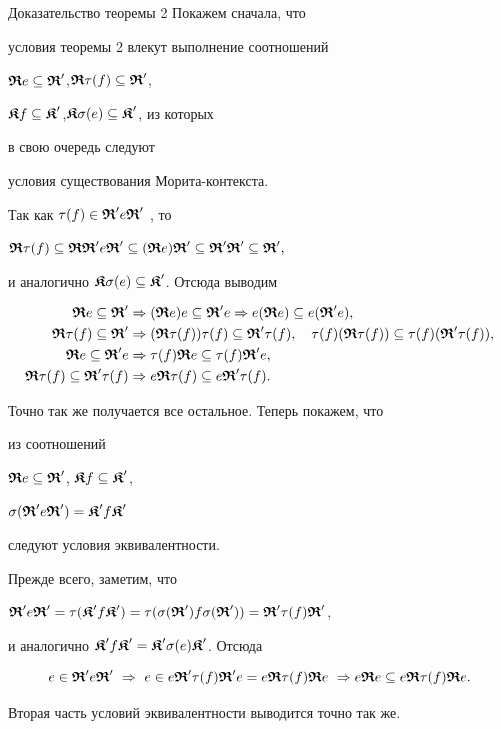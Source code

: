 \begin{pf*}{Доказательство теоремы 2} Покажем сначала, что


условия теоремы 2 влекут выполнение соотношений


$ \boldsymbol{\frak R} e \subseteq \boldsymbol{\frak R}'$,$\boldsymbol{\frak R} \tau(f) \subseteq \boldsymbol{\frak R}'$,


$ \boldsymbol{\frak K} f \subseteq \boldsymbol{\frak K}'$,$\boldsymbol{\frak K} \sigma(e) \subseteq \boldsymbol{\frak K}'$, из которых


в свою очередь следуют


условия существования Морита-контекста.


Так как $\tau(f) \in \boldsymbol{\frak R}'e \boldsymbol{\frak R}'$ , то


$\R\t(f) \subseteq \R\R' e \R' \subseteq (\R e)\R'


\subseteq \R'\R' \subseteq \R',$


и аналогично $ \boldsymbol{\frak K}\sigma(e) \subseteq \boldsymbol{\frak K}'$. Отсюда выводим


\begin{align*}


\R e \subseteq \R' &\Rightarrow 


(\R e)e \subseteq \R' e \Rightarrow 


e(\R e) \subseteq e(\R' e),\\


%


\R\t(f) \subseteq \R' &\Rightarrow 


(\R \t(f))\t(f) \subseteq \R' \t(f),


\quad \t(f)(\R\t(f))\subseteq \t(f)(\R'\t(f)),\\


%


\R e \subseteq \R' e &\Rightarrow 


\t(f) \R e \subseteq \t(f) \R' e,\\


%


\R \t(f) \subseteq \R'\t(f) &\Rightarrow 


e \R \t(f) \subseteq e \R'\t(f).


\end{align*}


Точно так же получается все остальное. Теперь покажем, что


из соотношений


$ \boldsymbol{\frak R} e \subseteq \boldsymbol{\frak R}'$, $\boldsymbol{\frak K} f \subseteq \boldsymbol{\frak K}' $,


$\sigma(\boldsymbol{\frak R}' e \boldsymbol{\frak R}') = \boldsymbol{\frak K}' f \boldsymbol{\frak K}'$


следуют условия эквивалентности.


Прежде всего, заметим, что


$ \boldsymbol{\frak R}' e \boldsymbol{\frak R}' = \tau(\boldsymbol{\frak K}'f \boldsymbol{\frak K}')= \tau(\sigma(\boldsymbol{\frak R}') f \sigma(\boldsymbol{\frak R}'))=\boldsymbol{\frak R}' \tau(f) \boldsymbol{\frak R}'$,


и аналогично $\boldsymbol{\frak K}' f \boldsymbol{\frak K}' =\boldsymbol{\frak K}' \sigma(e) \boldsymbol{\frak K}'$. Отсюда


$$


e \in \R' e \R' \ \Rightarrow \ e \in e \R' \t(f) \R' e =


e \R \t(f) \R e \ \Rightarrow e\R e \subseteq e \R \t(f) \R e.


$$


Вторая часть условий эквивалентности выводится точно так же.


\end{pf*}





